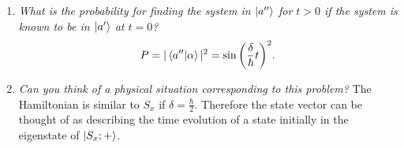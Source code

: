 \begin{example}
\begin{enumerate}
\begin{equation}
\begin{split}
			\end{split}
		\end{equation} 
		Now, to find the time independent coefficients.
		\begin{equation}
			t=0:\qquad \ket{\alpha(0)}=\ket{a'} \Rightarrow c_1=c_2.
		\end{equation} 
		From requiring normalization also I find $c_i=\frac{1}{\sqrt{2}}$. Thereby
		\begin{equation}
			\ket{\alpha}=\cos\bigg(\frac{\delta}{\hbar}t\bigg)\ket{a'}-i\sin\bigg(\frac{\delta}{\hbar}t\bigg)\ket{a''}\doteq \begin{bmatrix}
				\cos\bigg(\frac{\delta}{\hbar}t\bigg)\\
				-i\sin\bigg(\frac{\delta}{\hbar}t\bigg)\\
			\end{bmatrix}.
		\end{equation} 
		Test by insertion into Schrödinger equation
		\begin{equation}
			i\hbar \frac{\partial}{\partial t}\begin{bmatrix}
				\cos\bigg(\frac{\delta}{\hbar}t\bigg)\\
				-i\sin\bigg(\frac{\delta}{\hbar}t\bigg)\\
			\end{bmatrix}=\begin{bmatrix}
				0 & \delta  \\
				\delta & 0\\
			\end{bmatrix}\begin{bmatrix}
				\cos\bigg(\frac{\delta}{\hbar}t\bigg)\\
				-i\sin\bigg(\frac{\delta}{\hbar}t\bigg)\\
			\end{bmatrix}.
		\end{equation} 
		Which checks out.
		\item \emph{What is the probability for finding the system in $\ket{a''}$ for $t>0$ if the system is known to be in $\ket{a'}$ at $t=0$?}\newline
		\begin{equation}
			P=|\braket{a''|\alpha}|^2=\sin\bigg(\frac{\delta}{\hbar}t\bigg)^2.
		\end{equation} 
		\item \emph{Can you think of a physical situation corresponding to this problem?}\newline
		The Hamiltonian is similar to $S_x$ if $\delta=\frac{\hbar}{2}$. Therefore the state vector can be thought of as describing the time evolution of a state initially in the eigenstate of $\ket{S_x;+}$.
	\end{enumerate}
\end{example}

